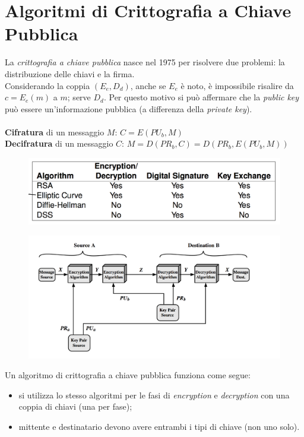 \documentclass[11pt, a4paper, twoside, italian]{report}
\theoremstyle{plain}
\begin{document}
\chapter*{Algoritmi di Crittografia a Chiave Pubblica}
La \textit{crittografia a chiave pubblica} nasce nel 1975 per risolvere due problemi: la distribuzione delle chiavi e la firma.\\
Considerando la coppia $(E_e, D_d)$, anche se $E_e$ è noto, è impossibile risalire da $c=E_e(m)$ a $m$; serve $D_d$. Per questo motivo si può affermare che la \textit{public key} può essere un'informazione pubblica (a differenza della \textit{private key}).\\\\
\textbf{Cifratura} di un messaggio $M$: $C = E(PU_{b}, M)$\\
\textbf{Decifratura} di un messaggio $C$: $M = D(PR_{b}, C) = D(PR_{b}, E(PU_{b}, M))$
\begin{multicols}{2}
	\begin{figure}[H]
		\centering
		\includegraphics[scale=0.32]{confrontoalgoritmichiavepubblica}
	\end{figure}
	\columnbreak
	\begin{figure}[H]
		\centering
		\includegraphics[scale=0.36]{secrecyauthenticationsicurezzareti}
	\end{figure}
\end{multicols}
\noindent
Un algoritmo di crittografia a chiave pubblica funziona come segue:
\begin{itemize}
	\item si utilizza lo stesso algoritmi per le fasi di \textit{encryption} e \textit{decryption} con una coppia di chiavi (una per fase);
	\item mittente e destinatario devono avere entrambi i tipi di chiave (non uno solo).
	\newline
\end{itemize}
\end{document}
